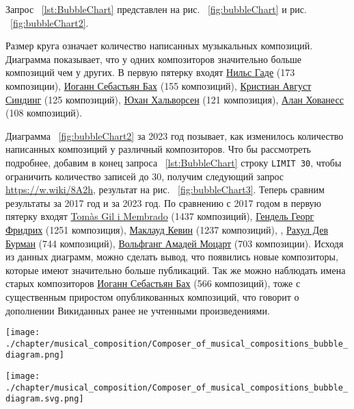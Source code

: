 Запрос ~\ref{lst:BubbleChart} представлен на рис. ~\ref{fig:bubbleChart} и рис. ~\ref{fig:bubbleChart2}.

Размер круга означает количество написанных музыкальных композиций. Диаграмма показывает, что у одних композиторов значительно больше композиций чем у других. В первую пятерку входят \href{https://ru.wikipedia.org/wiki/Гаде,_Нильс}{Нильс Гаде} (\num{173} композиции), \href{https://ru.wikipedia.org/wiki/Бах,_Иоганн_Себастьян}{Иоганн Себастьян Бах} (\num{155} композиций), \href{https://ru.wikipedia.org/wiki/Синдинг,_Кристиан_Август}{Кристиан Август Синдинг} (\num{125} композиций), \href{https://ru.wikipedia.org/wiki/Хальворсен,_Юхан}{Юхан Хальворсен} (\num{121} композиция), \href{https://ru.wikipedia.org/wiki/Хованесс,_Алан}{Алан Хованесс} (\num{108} композиций).

Диаграмма ~\ref{fig:bubbleChart2} за 2023 год позывает, как изменилось количество написанных композиций у различный композиторов. Что бы рассмотреть подробнее, добавим в конец запроса ~\ref{lst:BubbleChart} строку  \lstinline|LIMIT 30|, чтобы ограничить количество записей до 30, получим следующий запрос \href{https://w.wiki/8A2h}{https://w.wiki/8A2h}, результат на рис. ~\ref{fig:bubbleChart3}. Теперь сравним результаты за 2017 год и за 2023 год.
По сравнению с 2017 годом в первую пятерку входят \href{https://ca.wikipedia.org/wiki/Tomàs_Gil_i_Membrado}{Tomàs Gil i Membrado} (\num{1437} композиций), \href{https://ru.wikipedia.org/wiki/Гендель,_Георг_Фридрих}{Гендель Георг Фридрих} (\num{1251} композиция), \href{https://ru.wikipedia.org/wiki/Маклауд,_Кевин}{Маклауд Кевин} (\num{1237} композиций), , \href{https://en.wikipedia.org/wiki/R._D._Burman}{Рахул Дев Бурман} (\num{744} композиций), \href{https://ru.wikipedia.org/wiki/Моцарт,_Вольфганг_Амадей}{Вольфганг Амадей Моцарт} (\num{703} композиции). Исходя из данных диаграмм, можно сделать вывод, что появились новые композиторы, которые имеют значительно больше публикаций. Так же можно наблюдать имена старых композиторов \href{https://ru.wikipedia.org/wiki/Бах,_Иоганн_Себастьян}{Иоганн Себастьян Бах} (\num{566} композиций), тоже с существенным приростом опубликованных композиций, что говорит о дополнении Викиданных ранее не учтенными произведениями.

\begin{figure*}
	\texttt{[image: ./chapter/musical\_composition/Composer\_of\_musical\_compositions\_bubble\_diagram.png]}
	\caption[Пузырьковая диаграмма композиторов по количеству написанных композиций на 2017 год]{Пузырьковая диаграмма композиторов по количеству написанных композиций на 2017 год}%
 	\label{fig:bubbleChart}%
\end{figure*}
\begin{figure*}
	\texttt{[image: ./chapter/musical\_composition/Composer\_of\_musical\_compositions\_bubble\_diagram.svg.png]}
	\caption[Пузырьковая диаграмма композиторов по количеству написанных композиций на 2023 год]{Пузырьковая диаграмма композиторов по количеству написанных композиций на 2023 год}%
	\label{fig:bubbleChart2}%
\end{figure*}


